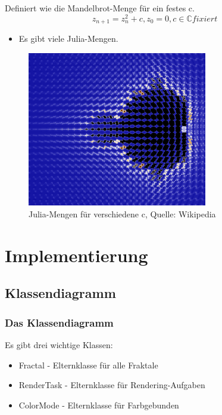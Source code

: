 \documentclass[unknownkeysallowed]{beamer}
\begin{document}
\begin{frame}
  Definiert wie die Mandelbrot-Menge für ein festes c.
  \begin{equation*}
    z_{n+1} = z^2_n + c, z_0 = 0, c \in \mathbb{C} fixiert
  \end{equation*}
  \begin{itemize}
    \item Es gibt viele Julia-Mengen.
  \end{itemize}
\end{frame}

\begin{frame}
  \begin{figure}[ht]
    \centering
    \includegraphics[width=0.7\textwidth]{images/julia-sets.png}
    \caption{Julia-Mengen für verschiedene c, Quelle: Wikipedia}
  \end{figure}
\end{frame}


\section{Implementierung}

\subsection{Klassendiagramm}

\begin{frame}
  \frametitle{Das Klassendiagramm}
  Es gibt drei wichtige Klassen:
  \begin{itemize}
    \item Fractal - Elternklasse für alle Fraktale
    \item RenderTask - Elternklasse für Rendering-Aufgaben
    \item ColorMode - Elternklasse für Farbgebunden
  \end{itemize}
\end{frame}
\end{document}
